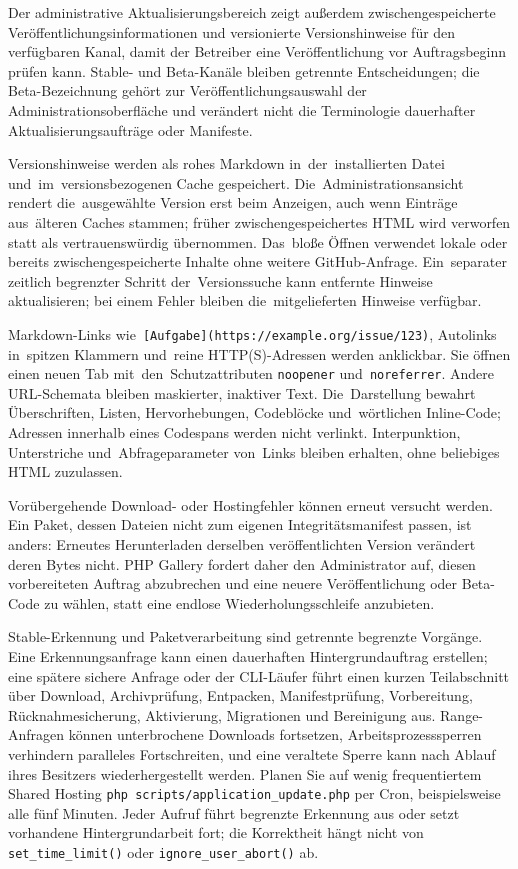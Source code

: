 \documentclass[11pt,a4paper]{article}
\newcommand{\filepath}[1]{\path{#1}}
\newcommand{\codeword}[1]{\nolinkurl{#1}}
\begin{document}
Der administrative Aktualisierungsbereich zeigt außerdem zwischengespeicherte
Veröffentlichungsinformationen und versionierte Versionshinweise für den
verfügbaren Kanal, damit der Betreiber eine Veröffentlichung vor Auftragsbeginn
prüfen kann. Stable- und Beta-Kanäle bleiben getrennte Entscheidungen; die
Beta-Bezeichnung gehört zur Veröffentlichungsauswahl der
Administrationsoberfläche und verändert nicht die Terminologie dauerhafter
Aktualisierungsaufträge oder Manifeste.

Versionshinweise werden als rohes Markdown in~der~installierten Datei
\filepath{PATCH_NOTES.md} und~im~versionsbezogenen Cache gespeichert.
Die~Administrationsansicht rendert die~ausgewählte Version erst beim Anzeigen,
auch wenn Einträge aus~älteren Caches stammen; früher zwischengespeichertes HTML
wird verworfen statt als vertrauenswürdig übernommen. Das~bloße Öffnen verwendet
lokale oder bereits zwischengespeicherte Inhalte ohne weitere GitHub-Anfrage.
Ein~separater zeitlich begrenzter Schritt der~Versionssuche kann entfernte
Hinweise aktualisieren; bei einem Fehler bleiben die~mitgelieferten Hinweise
verfügbar.

Markdown-Links wie~\codeword{[Aufgabe](https://example.org/issue/123)},
Autolinks in~spitzen Klammern und~reine HTTP(S)-Adressen werden anklickbar. Sie
öffnen einen neuen Tab mit~den~Schutzattributen \codeword{noopener}
und~\codeword{noreferrer}. Andere URL-Schemata bleiben maskierter, inaktiver
Text. Die~Darstellung bewahrt Überschriften, Listen, Hervorhebungen, Codeblöcke
und~wörtlichen Inline-Code; Adressen innerhalb eines Codespans werden nicht
verlinkt. Interpunktion, Unterstriche und~Abfrageparameter von~Links bleiben
erhalten, ohne beliebiges HTML zuzulassen.


Vorübergehende Download- oder Hostingfehler können erneut versucht werden. Ein
Paket, dessen Dateien nicht zum eigenen Integritätsmanifest passen, ist anders:
Erneutes Herunterladen derselben veröffentlichten Version verändert deren Bytes
nicht. PHP Gallery fordert daher den Administrator auf, diesen vorbereiteten
Auftrag abzubrechen und eine neuere Veröffentlichung oder Beta-Code zu wählen,
statt eine endlose Wiederholungsschleife anzubieten.

Stable-Erkennung und Paketverarbeitung sind getrennte begrenzte Vorgänge. Eine
Erkennungsanfrage kann einen dauerhaften Hintergrundauftrag erstellen; eine
spätere sichere Anfrage oder der CLI-Läufer führt einen kurzen Teilabschnitt
über Download, Archivprüfung, Entpacken, Manifestprüfung, Vorbereitung,
Rücknahmesicherung, Aktivierung, Migrationen und Bereinigung aus. Range-Anfragen
können unterbrochene Downloads fortsetzen, Arbeitsprozesssperren verhindern
paralleles Fortschreiten, und eine veraltete Sperre kann nach Ablauf ihres
Besitzers wiederhergestellt werden. Planen Sie auf wenig frequentiertem Shared
Hosting \codeword{php scripts/application_update.php} per Cron, beispielsweise
alle fünf Minuten. Jeder Aufruf führt begrenzte Erkennung aus oder setzt
vorhandene Hintergrundarbeit fort; die Korrektheit hängt nicht von
\codeword{set_time_limit()} oder \codeword{ignore_user_abort()} ab.
\end{document}
